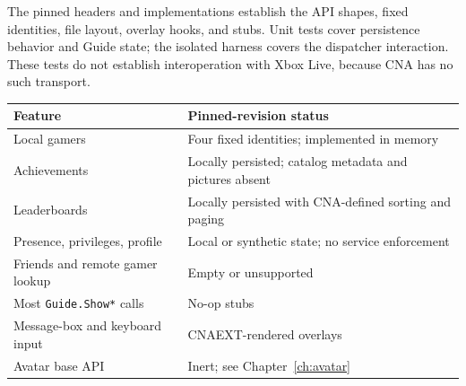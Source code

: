 The pinned headers and implementations establish the API shapes, fixed identities, file
layout, overlay hooks, and stubs. Unit tests cover persistence behavior and Guide state;
the isolated harness covers the dispatcher interaction. These tests do not establish
interoperation with Xbox Live, because CNA has no such transport.

\begin{center}
\begin{tabularx}{\textwidth}{@{}lX@{}}
\toprule
\textbf{Feature} & \textbf{Pinned-revision status} \\
\midrule
Local gamers & Four fixed identities; implemented in memory \\
Achievements & Locally persisted; catalog metadata and pictures absent \\
Leaderboards & Locally persisted with CNA-defined sorting and paging \\
Presence, privileges, profile & Local or synthetic state; no service enforcement \\
Friends and remote gamer lookup & Empty or unsupported \\
Most \texttt{Guide.Show*} calls & No-op stubs \\
Message-box and keyboard input & CNAEXT-rendered overlays \\
Avatar base API & Inert; see Chapter~\ref{ch:avatar} \\
\bottomrule
\end{tabularx}
\end{center}
